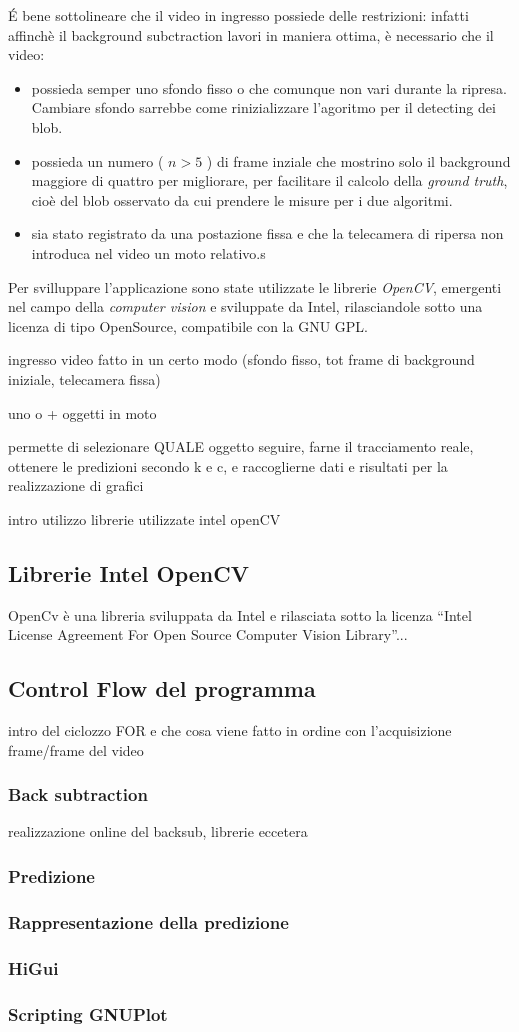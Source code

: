 \'E bene sottolineare che il video in ingresso possiede delle restrizioni: infatti affinchè il background subctraction lavori in maniera ottima, è necessario che il video:
\begin{itemize}
 \item possieda semper uno sfondo fisso o che comunque non vari durante la ripresa. Cambiare sfondo sarrebbe come rinizializzare l'agoritmo per il detecting dei blob.
\item possieda un numero ( $n > 5 $ ) di frame inziale che mostrino solo il background maggiore di quattro per migliorare, per facilitare il calcolo della \textit{ground truth}, cioè del blob osservato da cui prendere le misure per i due algoritmi.
\item sia stato registrato da una postazione fissa e che la telecamera di ripersa non introduca nel video un moto relativo.s 
 \end{itemize}

Per svilluppare l'applicazione sono state utilizzate le librerie \textit{OpenCV}, emergenti nel campo della \textit{computer vision}  e sviluppate da Intel, rilasciandole sotto una licenza di tipo OpenSource, compatibile con la GNU GPL.


ingresso video fatto in un certo modo (sfondo fisso, tot frame di background iniziale, telecamera fissa)

uno o + oggetti in moto

permette di selezionare QUALE oggetto seguire, farne il tracciamento reale, ottenere le predizioni secondo k e c, e raccoglierne dati e risultati per la realizzazione di grafici

intro utilizzo librerie utilizzate intel openCV
\subsection{Librerie Intel OpenCV}
OpenCv è una libreria sviluppata da Intel e rilasciata sotto la licenza ``Intel License Agreement For Open Source Computer Vision Library''...

\subsection{Control Flow del programma}
intro del ciclozzo FOR e che cosa viene fatto in ordine con l'acquisizione frame/frame del video

\subsubsection{Back subtraction}
realizzazione online del backsub, librerie eccetera
\subsubsection{Predizione}
\subsubsection{Rappresentazione della predizione}
\subsubsection{HiGui}
\subsubsection{Scripting GNUPlot}

